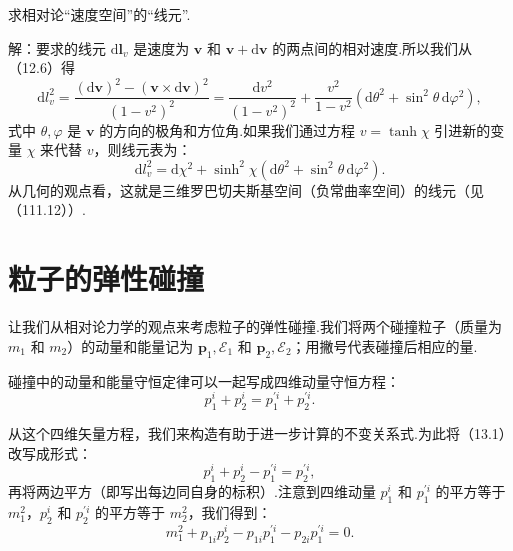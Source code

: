 \begin{xiti}

\quad 求相对论“速度空间”的“线元”.

解：要求的线元 $\mathrm{d}\boldsymbol{l}_v$ 是速度为 $\boldsymbol{v}$ 和 $\boldsymbol{v}+\mathrm{d}\boldsymbol{v}$ 的两点间的相对速度.所以我们从（12.6）得
\begin{equation*}
  \mathrm{d}l_v^2=\frac{(\mathrm{d}\boldsymbol{v})^2
  -(\boldsymbol{v}\times\mathrm{d}\boldsymbol{v})^2}{(1-v^2)^2}
  =\frac{\mathrm{d}v^2}{(1-v^2)^2}
  +\frac{v^2}{1-v^2}(\mathrm{d}\theta^2+\sin^2\theta\,\mathrm{d}\varphi^2),
\end{equation*}
式中 $\theta,\varphi$ 是 $\boldsymbol{v}$ 的方向的极角和方位角.如果我们通过方程 $v=\tanh\chi$ 引进新的变量 $\chi$ 来代替 $v$，则线元表为：
\begin{equation*}
  \mathrm{d}l_v^2=\mathrm{d}\chi^2+\sinh^2\chi
  (\mathrm{d}\theta^2+\sin^2\theta\,\mathrm{d}\varphi^2).
\end{equation*}
从几何的观点看，这就是三维罗巴切夫斯基空间（负常曲率空间）的线元（见（111.12））.

\end{xiti}

\section{粒子的弹性碰撞}

让我们从相对论力学的观点来考虑粒子的弹性碰撞.我们将两个碰撞粒子（质量为 $m_1$ 和 $m_2$）的动量和能量记为 $\boldsymbol{p}_1,\mathcal{E}_1$ 和 $\boldsymbol{p}_2,\mathcal{E}_2$；用撇号代表碰撞后相应的量.

碰撞中的动量和能量守恒定律可以一起写成四维动量守恒方程：
\begin{equation}
  p_1^i+p_2^i=p_1^{\prime i}+p_2^{\prime i}.
\end{equation}

从这个四维矢量方程，我们来构造有助于进一步计算的不变关系式.为此将（13.1）改写成形式：
\begin{equation*}
  p_1^i+p_2^i-p_1^{\prime i}=p_2^{\prime i},
\end{equation*}
再将两边平方（即写出每边同自身的标积）.注意到四维动量 $p_1^i$ 和 $p_1^{\prime i}$ 的平方等于 $m_1^2$，$p_2^i$ 和 $p_2^{\prime i}$ 的平方等于 $m_2^2$，我们得到：
\begin{equation}
  m_1^2+p_{1i}p_2^i-p_{1i}p_1^{\prime i}-p_{2i}p_1^{\prime i}=0.
\end{equation}

